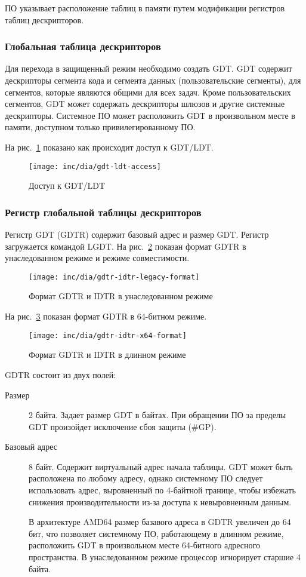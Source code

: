 ПО указывает расположение таблиц в памяти путем модификации регистров таблиц дескрипторов.

\subsubsection*{Глобальная таблица дескрипторов}
Для перехода в защищенный режим необходимо создать GDT. GDT содержит дескрипторы
сегмента кода и сегмента данных (пользовательские сегменты), для сегментов, которые
являются общими для всех задач. Кроме пользовательских сегментов, GDT может содержать
дескрипторы шлюзов и другие системные дескрипторы. Системное ПО может расположить
GDT в произвольном месте в памяти, доступном только привилегированному ПО.

На рис.~\ref{fig:gdt-ldt-access} показано как происходит доступ к GDT/LDT.

\begin{figure}
  \centering
  \texttt{[image: inc/dia/gdt-ldt-access]}
  \caption{Доступ к GDT/LDT}
  \label{fig:gdt-ldt-access}
\end{figure}

\subsubsection*{Регистр глобальной таблицы дескрипторов}
Регистр GDT (GDTR) содержит базовый адрес и размер GDT. Регистр загружается командой LGDT.
На рис.~\ref{fig:gdtr-idtr-legacy-format} показан формат GDTR в унаследованном режиме и режиме совместимости.

\begin{figure}
  \centering
  \texttt{[image: inc/dia/gdtr-idtr-legacy-format]}
  \caption{Формат GDTR и IDTR в унаследованном режиме}
  \label{fig:gdtr-idtr-legacy-format}
\end{figure}

На рис.~\ref{fig:gdtr-idtr-x64-format} показан формат GDTR в 64-битном режиме.

\begin{figure}
  \centering
  \texttt{[image: inc/dia/gdtr-idtr-x64-format]}
  \caption{Формат GDTR и IDTR в длинном режиме}
  \label{fig:gdtr-idtr-x64-format}
\end{figure}

GDTR состоит из двух полей:
\begin{description}
\item[Размер] 2 байта. Задает размер GDT в байтах. При обращении ПО за пределы GDT произойдет
	исключение сбоя защиты (\#GP).
\item[Базовый адрес] 8 байт. Содержит виртуальный адрес начала таблицы. GDT может быть расположена
	по любому адресу, однако системному ПО следует использовать адрес, выровненный по 4-байтной границе,
	чтобы избежать снижения производительности из-за доступа к невыровненным данным.

	В архитектуре AMD64 размер базавого адреса в GDTR увеличен до 64 бит, что позволяет системному ПО,
	работающему в длинном режиме, расположить GDT в произвольном месте 64-битного адресного пространства.
	В унаследованном режиме процессор игнорирует старшие 4 байта.
\end{description}


